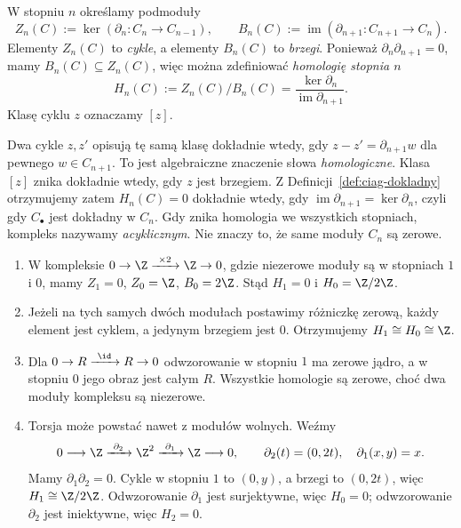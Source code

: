 \begin{definicja}
\label{def:homologia-algebraiczna}
W stopniu $n$ określamy podmoduły
\[
 Z_n(C):=\ker(\partial_n:C_n\to C_{n-1}),\qquad
 B_n(C):=\operatorname{im}(\partial_{n+1}:C_{n+1}\to C_n).
\]
Elementy $Z_n(C)$ to \emph{cykle}, a elementy
$B_n(C)$ to \emph{brzegi}. Ponieważ
$\partial_n\partial_{n+1}=0$, mamy $B_n(C)\subseteq Z_n(C)$,
więc można zdefiniować \emph{homologię stopnia $n$}
\begin{equation}\label{eq:homologia-def}
 H_n(C):=Z_n(C)/B_n(C)
 =\frac{\ker \partial_n}{\operatorname{im}\partial_{n+1}}.
\end{equation}
Klasę cyklu $z$ oznaczamy $[z]$.
\end{definicja}

Dwa cykle $z,z'$ opisują tę samą klasę dokładnie
wtedy, gdy $z-z'=\partial_{n+1}w$ dla pewnego
$w\in C_{n+1}$. To jest algebraiczne
znaczenie słowa \emph{homologiczne}.
Klasa $[z]$ znika dokładnie wtedy, gdy
$z$ jest brzegiem. Z Definicji~\ref{def:ciag-dokladny}
otrzymujemy zatem
$H_n(C)=0$ dokładnie wtedy, gdy
$\operatorname{im}\partial_{n+1}=\ker\partial_n$,
czyli gdy $C_\bullet$ jest dokładny w $C_n$.
Gdy znika homologia we wszystkich stopniach,
kompleks nazywamy \emph{acyklicznym}.
Nie znaczy to, że same moduły $C_n$ są zerowe.

\begin{przyklad}
\label{prz:homologia-rachunki}
\begin{enumerate}[leftmargin=*]
\item W kompleksie
      $0\to\Z\xrightarrow{\ \times2\ }\Z\to0$,
      gdzie niezerowe moduły są w stopniach
      $1$ i $0$, mamy $Z_1=0$, $Z_0=\Z$,
      $B_0=2\Z$. Stąd
      $H_1=0$ i $H_0=\Z/2\Z$.
\item Jeżeli na tych samych dwóch modułach
      postawimy różniczkę zerową, każdy element
      jest cyklem, a jedynym brzegiem jest $0$.
      Otrzymujemy $H_1\cong H_0\cong\Z$.
\item Dla
      $0\to R\xrightarrow{\ \id\ }R\to0$
      odwzorowanie w stopniu $1$ ma zerowe jądro,
      a w stopniu $0$ jego obraz jest całym $R$.
      Wszystkie homologie są zerowe, choć
      dwa moduły kompleksu są niezerowe.
\item Torsja może powstać nawet z modułów
      wolnych. Weźmy
      \[
       0\longrightarrow\Z
       \xrightarrow{\ \partial_2\ }\Z^2
       \xrightarrow{\ \partial_1\ }\Z
       \longrightarrow0,\qquad
       \partial_2(t)=(0,2t),\quad \partial_1(x,y)=x.
      \]
      Mamy $\partial_1\partial_2=0$.
      Cykle w stopniu $1$ to $(0,y)$,
      a brzegi to $(0,2t)$, więc
      $H_1\cong\Z/2\Z$. Odwzorowanie $\partial_1$ jest
      surjektywne, więc $H_0=0$; odwzorowanie
      $\partial_2$ jest iniektywne, więc $H_2=0$.
\end{enumerate}
\end{przyklad}

